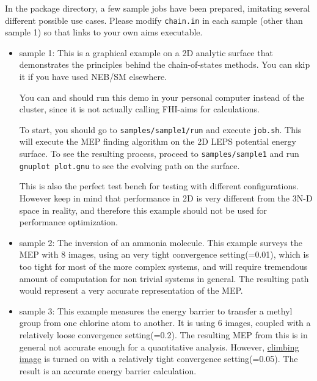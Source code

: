 In the package directory, a few sample jobs have been prepared, imitating several different possible use cases. Please modify \texttt{chain.in} in each sample (other than sample 1) so that  links to your own aims executable.
\begin{itemize}

 \item sample 1: This is a graphical example on a 2D analytic surface that demonstrates the principles behind the chain-of-states methods. You can skip it if you have used NEB/SM elsewhere. 
 
 You can and should run this demo in your personal computer instead of the cluster, since it is not actually calling FHI-aims for calculations.

 To start, you should go to \texttt{samples/sample1/run} and execute \texttt{job.sh}. This will execute the MEP finding algorithm on the 2D LEPS potential energy surface. To see the resulting process, proceed to \texttt{samples/sample1} and run \texttt{gnuplot plot.gnu} to see the evolving path on the surface. 
 
 This is also the perfect test bench for testing with different configurations. However keep in mind that performance in 2D is very different from the 3N-D space in reality, and therefore this example should not be used for performance optimization.
 \item sample 2: The inversion of an ammonia molecule. This example surveys the MEP with 8 images, using an very tight convergence setting(=0.01), which is too tight for most of the more complex systems, and will require tremendous amount of computation for non trivial systems in general. The resulting path would represent a very accurate representation of the MEP. 
 \item sample 3: This example measures the energy barrier to transfer a methyl group from one chlorine atom to another. It is using 6 images, coupled with a relatively loose convergence setting(=0.2). The resulting MEP from this is in general not accurate enough for a quantitative analysis. However, \hyperlink{aimsChainuse\_climb}{climbing image} is turned on with a relatively tight convergence setting(=0.05). The result is an accurate energy barrier calculation. 
 

\end{itemize}
